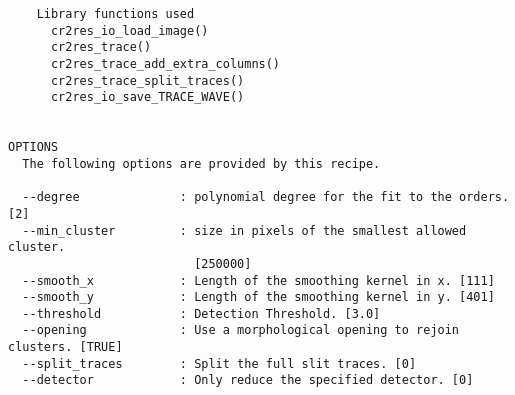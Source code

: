 \begin{verbatim}
    Library functions used                                                
      cr2res_io_load_image()                                              
      cr2res_trace()                                                      
      cr2res_trace_add_extra_columns()                                    
      cr2res_trace_split_traces()                                         
      cr2res_io_save_TRACE_WAVE()                                         
  

OPTIONS
  The following options are provided by this recipe.

  --degree              : polynomial degree for the fit to the orders. [2]
  --min_cluster         : size in pixels of the smallest allowed cluster.
                          [250000]
  --smooth_x            : Length of the smoothing kernel in x. [111]
  --smooth_y            : Length of the smoothing kernel in y. [401]
  --threshold           : Detection Threshold. [3.0]
  --opening             : Use a morphological opening to rejoin clusters. [TRUE]
  --split_traces        : Split the full slit traces. [0]
  --detector            : Only reduce the specified detector. [0]

\end{verbatim}
